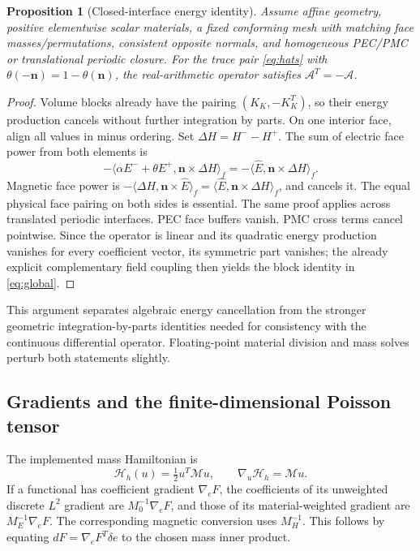 \documentclass[11pt,a4paper]{article}
\newcommand{\n}{\mathbf n}
\newtheorem{proposition}{Proposition}[section]
\begin{document}
\begin{proposition}[Closed-interface energy identity]\label{prop:energy}
Assume affine geometry, positive elementwise scalar materials, a fixed
conforming mesh with matching face masses/permutations, consistent opposite
normals, and homogeneous PEC/PMC or translational periodic closure.
For the trace pair \eqref{eq:hats} with \(\theta(-\n)=1-\theta(\n)\), the
real-arithmetic operator satisfies \(\mathcal A^T=-\mathcal A\).
\end{proposition}
\begin{proof}
Volume blocks already have the pairing \((K_K,-K_K^T)\), so their energy
production cancels without further integration by parts. On one interior
face, align all values in minus ordering. Set \(\Delta H=H^--H^+\).
The sum of electric face power from both elements is
\begin{equation}
 -\langle\alpha E^-+\theta E^+,\n\times\Delta H\rangle_f
 =-\langle\widehat E,\n\times\Delta H\rangle_f.
\end{equation}
Magnetic face power is
\(-\langle\Delta H,\n\times\widehat E\rangle_f
=\langle\widehat E,\n\times\Delta H\rangle_f\), and cancels it.
The equal physical face pairing on both sides is essential. The same proof
applies across translated periodic interfaces. PEC face buffers vanish.
PMC cross terms cancel pointwise. Since the operator is linear and its
quadratic energy production vanishes for every coefficient vector, its
symmetric part vanishes; the already explicit complementary field coupling
then yields the block identity in \eqref{eq:global}.
\end{proof}
This argument separates algebraic energy cancellation from the stronger
geometric integration-by-parts identities needed for consistency with the
continuous differential operator. Floating-point material division and
mass solves perturb both statements slightly.

\subsection{Gradients and the finite-dimensional Poisson tensor}
The implemented mass Hamiltonian is
\begin{equation}\label{eq:hamiltonian}
 \mathcal H_h(u)=\tfrac12u^T\mathcal M u,
 \qquad \nabla_u\mathcal H_h=\mathcal M u.
\end{equation}
If a functional has coefficient gradient \(\nabla_e F\), the coefficients
of its unweighted discrete \(L^2\) gradient are \(M_0^{-1}\nabla_e F\),
and those of its material-weighted gradient are \(M_E^{-1}\nabla_e F\).
The corresponding magnetic conversion uses \(M_H^{-1}\). This follows
by equating \(dF=\nabla_eF^T\delta e\) to the chosen mass inner product.
\end{document}
